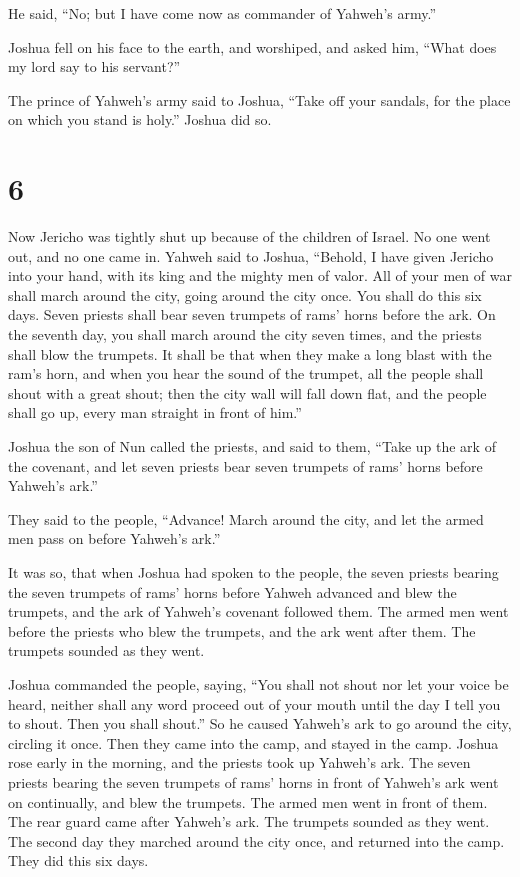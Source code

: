  He said, ``No; but I have come now as commander of
Yahweh's army.''

Joshua fell on his face to the earth, and worshiped, and asked him,
``What does my lord say to his servant?''

 The prince of Yahweh's army said to Joshua, ``Take off
your sandals, for the place on which you stand is holy.'' Joshua did so.

\hypertarget{section-5}{%
\section{6}\label{section-5}}

 Now Jericho was tightly shut up because of the children of
Israel. No one went out, and no one came in.  Yahweh said to
Joshua, ``Behold, I have given Jericho into your hand, with its king and
the mighty men of valor.  All of your men of war shall march
around the city, going around the city once. You shall do this six days.
 Seven priests shall bear seven trumpets of rams' horns
before the ark. On the seventh day, you shall march around the city
seven times, and the priests shall blow the trumpets.  It
shall be that when they make a long blast with the ram's horn, and when
you hear the sound of the trumpet, all the people shall shout with a
great shout; then the city wall will fall down flat, and the people
shall go up, every man straight in front of him.''

 Joshua the son of Nun called the priests, and said to them,
``Take up the ark of the covenant, and let seven priests bear seven
trumpets of rams' horns before Yahweh's ark.''

 They said to the people, ``Advance! March around the city,
and let the armed men pass on before Yahweh's ark.''

 It was so, that when Joshua had spoken to the people, the
seven priests bearing the seven trumpets of rams' horns before Yahweh
advanced and blew the trumpets, and the ark of Yahweh's covenant
followed them.  The armed men went before the priests who
blew the trumpets, and the ark went after them. The trumpets sounded as
they went.

 Joshua commanded the people, saying, ``You shall not shout
nor let your voice be heard, neither shall any word proceed out of your
mouth until the day I tell you to shout. Then you shall shout.''
 So he caused Yahweh's ark to go around the city, circling
it once. Then they came into the camp, and stayed in the camp.
 Joshua rose early in the morning, and the priests took up
Yahweh's ark.  The seven priests bearing the seven trumpets
of rams' horns in front of Yahweh's ark went on continually, and blew
the trumpets. The armed men went in front of them. The rear guard came
after Yahweh's ark. The trumpets sounded as they went.  The
second day they marched around the city once, and returned into the
camp. They did this six days.


